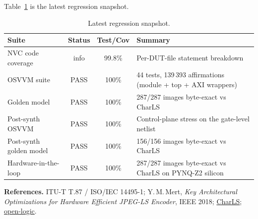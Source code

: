 \documentclass[10pt,a4paper]{article}
\begin{document}
\noindent Table~\ref{tab:regression} is the latest regression snapshot.

\begin{table}[H]
  \centering
  \caption{Latest regression snapshot.}
  \label{tab:regression}
\begin{tabularx}{\textwidth}{@{}l c c X@{}}
  \toprule
  \textbf{Suite} & \textbf{Status} & \textbf{Test/Cov} & \textbf{Summary} \\
  \midrule
  NVC code coverage       & info & 99.8\% & Per-DUT-file statement breakdown \\
  OSVVM suite             & PASS & 100\%  & 44 tests, 139\,393 affirmations (module + top + AXI wrappers) \\
  Golden model            & PASS & 100\%  & 287/287 images byte-exact vs CharLS \\
  Post-synth OSVVM        & PASS & 100\%  & Control-plane stress on the gate-level netlist \\
  Post-synth golden model & PASS & 100\%  & 156/156 images byte-exact vs CharLS \\
  Hardware-in-the-loop    & PASS & 100\%  & 287/287 images byte-exact vs CharLS on PYNQ-Z2 silicon \\
  \bottomrule
\end{tabularx}
\end{table}



\vspace{10pt}
\noindent\textbf{References.}
ITU-T T.87 / ISO/IEC 14495-1;
Y.\,M.\,Mert, \emph{Key Architectural Optimizations for Hardware Efficient
JPEG-LS Encoder}, IEEE 2018;
\href{https://github.com/team-charls/charls}{CharLS};
\href{https://github.com/open-logic/open-logic}{open-logic}.
\end{document}
